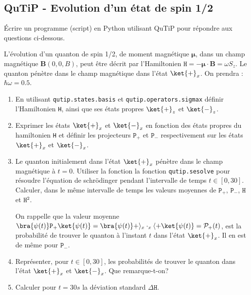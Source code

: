 \subsection{QuTiP - Evolution d'un état de spin 1/2}

Écrire un programme (script) en Python utilisant QuTiP pour répondre aux
questions ci-dessous.

L'évolution d'un quanton de spin 1/2, de moment magnétique $\mathbf{\mu}$, dans 
un champ magnétique $\textbf{B}(0,0,B)$, peut être décrit par l'Hamiltonien 
$\mathtt{H}=-\mathbf{\mu}\cdot\textbf{B}=\omega S_z$. Le quanton pénètre dans 
le champ magnétique dans l'état $\ket{+}_x$. On prendra : $\hbar\omega=0.5$.

\begin{enumerate}
\item En utilisant \texttt{qutip.states.basis} et 
\texttt{qutip.operators.sigmax} définir l'Hamiltonien \texttt{H}, ainsi que ses 
états propres $\ket{+}_z$ et $\ket{-}_z$.

\item Exprimer les états $\ket{+}_x$ et $\ket{-}_x$ en fonction des états  
propres du hamiltonien \texttt{H} et définir les projecteurs $\mathtt{P}_+$ et 
$\mathtt{P}_-$ respectivement sur les états $\ket{+}_x$ et $\ket{-}_x$.

\item Le quanton initialement dans l'état $\ket{+}_x$ pénètre dans le champ 
magnétique à $t=0$. Utiliser la fonction la fonction \texttt{qutip.sesolve} pour 
résoudre l'équation de schr\"odinger pendant l'intervalle de temps 
$t\in[0,30]$. Calculer, dans le même intervalle de temps les valeurs moyennes 
de $\mathtt{P}_+$, $\mathtt{P}_-$, $\mathtt{H}$ et $\mathtt{H^2}$.

On rappelle que la valeur moyenne 
$\bra{\psi(t)}\mathtt{P}_+\ket{\psi(t)}=\bra{\psi(t)}+\rangle_x 
\cdot_x\langle+\ket{\psi(t)}=\mathcal{P}_+(t)$, est la probabilité de trouver 
le quanton à l'instant $t$ dans l'état $\ket{+}_x$. Il en est de même pour 
$\mathtt{P}_-$.

\item Représenter, pour $t\in[0,30]$, les probabilités de trouver le quanton 
dans l'état $\ket{+}_x$ et $\ket{-}_x$. Que remarque-t-on?

\item Calculer pour $t=30s$ la déviation standard $\Delta \mathtt{H}$.
\end{enumerate}

